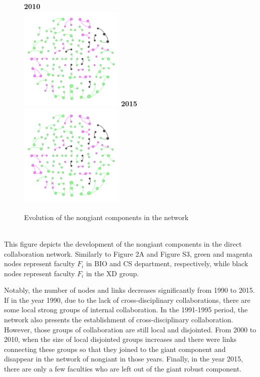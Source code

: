 \documentclass[10pt]{article}         %
\begin{document}
\begin{figure}[!htb]
  \endminipage\hfill
    \textbf{2010}\\
    \includegraphics[width=5cm, height=5cm]{S42010.png}
  \endminipage\hfill
    \textbf{2015}\\
    \includegraphics[width=5cm, height=5cm]{S42015.png}
  \endminipage
  \caption{Evolution of the nongiant components in the network}
  \label{fig:s4}
\end{figure}\\

This figure depicts the development of the nongiant components in the direct collaboration network. Similarly to Figure 2A and Figure S3, green and magenta nodes represent faculty $F_i$ in BIO and CS department, respectively, while black nodes represent faculty $F_i$ in the XD group. 

Notably, the number of nodes and links decreases significantly from 1990 to 2015. If in the year 1990, due to the lack of cross-disciplinary collaborations, there are some local strong groups of internal collaboration. In the 1991-1995 period, the network also presents the establishment of cross-disciplinary collaboration. However, those groups of collaboration are still local and disjointed. From 2000 to 2010, when the size of local disjointed groups increases and there were links connecting these groups so that they joined to the giant component and disappear in the network of nongiant in those years. Finally, in the year 2015, there are only a few faculties who are left out of the giant robust component.




\bigskip   %
\end{document}

